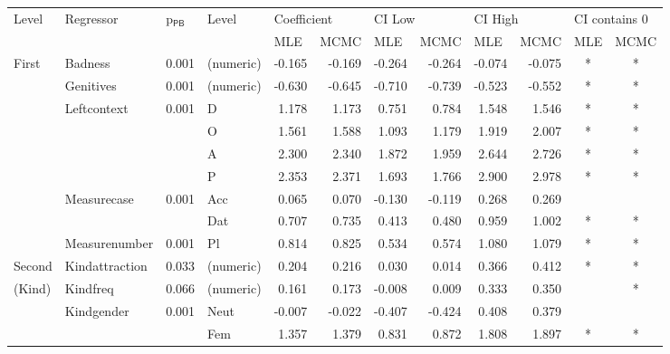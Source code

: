 \documentclass[USenglish]{article}
\newcommand{\Subsf}[1]{\ensuremath{\mathsf{_{#1}}}}
\newcommand{\pPB}{p\Subsf{PB}}
\begin{document}
\begin{table}
  \centering
    \begin{tabular}{llrlrrrrrrcc}
      Level & Regressor & \multicolumn{1}{l}{\pPB} & Level  & \multicolumn{2}{l}{Coefficient} & \multicolumn{2}{l}{CI Low} & \multicolumn{2}{l}{CI High} & \multicolumn{2}{l}{CI contains 0} \\
              &                   &       &          & \multicolumn{1}{l}{MLE} & \multicolumn{1}{l}{MCMC} & \multicolumn{1}{l}{MLE} & \multicolumn{1}{l}{MCMC} & \multicolumn{1}{l}{MLE} & \multicolumn{1}{l}{MCMC} & \multicolumn{1}{l}{MLE} & \multicolumn{1}{l}{MCMC} \\\midrule

    First     & Badness           & 0.001 & (numeric) & -0.165 & -0.169 & -0.264 & -0.264 & -0.074 & -0.075 &      * &      * \\
              & Genitives         & 0.001 & (numeric) & -0.630 & -0.645 & -0.710 & -0.739 & -0.523 & -0.552 &      * &      * \\
              & Leftcontext       & 0.001 & D         &  1.178 &  1.173 &  0.751 &  0.784 &  1.548 &  1.546 &      * &      * \\
              &                   &       & O         &  1.561 &  1.588 &  1.093 &  1.179 &  1.919 &  2.007 &      * &      * \\
              &                   &       & A         &  2.300 &  2.340 &  1.872 &  1.959 &  2.644 &  2.726 &      * &      * \\
              &                   &       & P         &  2.353 &  2.371 &  1.693 &  1.766 &  2.900 &  2.978 &      * &      * \\
              & Measurecase       & 0.001 & Acc       &  0.065 &  0.070 & -0.130 & -0.119 &  0.268 &  0.269 &        &        \\
              &                   &       & Dat       &  0.707 &  0.735 &  0.413 &  0.480 &  0.959 &  1.002 &      * &      * \\
	      & Measurenumber     & 0.001 & Pl        &  0.814 &  0.825 &  0.534 &  0.574 &  1.080 &  1.079 &      * &      * \\[0.5\baselineskip]
                                          
    Second    & Kindattraction    & 0.033 & (numeric) &  0.204 &  0.216 &  0.030 &  0.014 &  0.366 &  0.412 &      * &      * \\
    (Kind)    & Kindfreq          & 0.066 & (numeric) &  0.161 &  0.173 & -0.008 &  0.009 &  0.333 &  0.350 &        &      * \\
              & Kindgender        & 0.001 & Neut      & -0.007 & -0.022 & -0.407 & -0.424 &  0.408 &  0.379 &        &        \\
	      &                   &       & Fem       &  1.357 &  1.379 &  0.831 &  0.872 &  1.808 &  1.897 &      * &      * \\[0.5\baselineskip]
                                          

\end{tabular}
\end{table}
\end{document}
